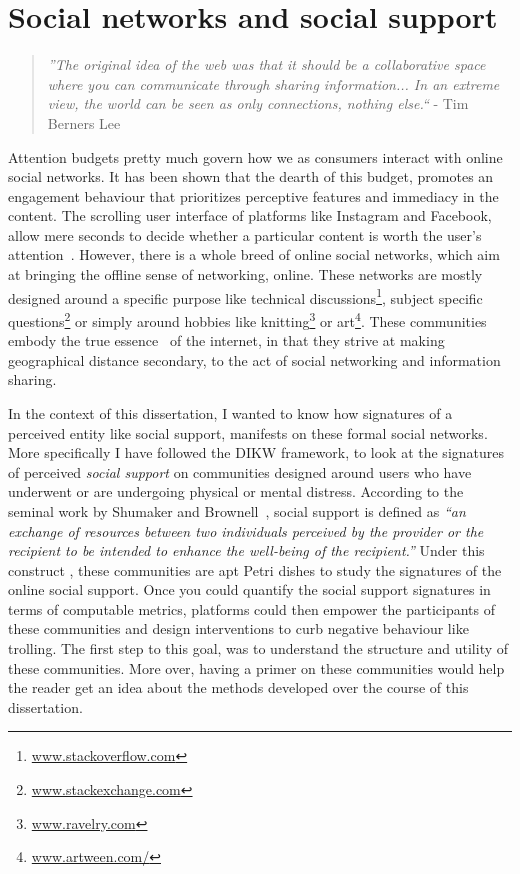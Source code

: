 
\chapter{Social networks and social support}

\label{chap:Utility_support}
\graphicspath{{Chapter3/plots/} {Chapter3/plots}}
\begin{quote}
    \textit{''The original idea of the web was that it should be a collaborative space where you can communicate through sharing information... In an extreme view, the world can be seen as only connections, nothing else.``} - Tim Berners Lee\cite{berners2001weaving} 
\end{quote}
Attention budgets pretty much govern how we as consumers interact with online social networks. It has been shown that the dearth of this budget, promotes an engagement behaviour that prioritizes perceptive features and immediacy in the content. The scrolling user interface of platforms like Instagram and Facebook, allow mere seconds to decide whether a particular content is worth the user's attention~\cite{eikelboom2017irresistible}. 
However, there is a whole breed of online social networks, which aim at bringing the offline sense of networking, online. These networks are mostly designed around a specific purpose like technical discussions\footnote{\url{www.stackoverflow.com}}, subject specific questions\footnote{\url{www.stackexchange.com}} or simply around hobbies like knitting\footnote{\url{www.ravelry.com}} or art\footnote{\url{www.artween.com/}}. These communities embody the true essence~\cite{berners2001weaving} of the internet, in that they strive at making geographical distance secondary, to the act of social networking and information sharing.

In the context of this dissertation, I wanted to know how signatures of a perceived entity like social support,  manifests on these formal social networks. More specifically I have followed the DIKW framework, to look at the signatures of perceived \textsl{social support} on communities designed around users who have underwent or are undergoing physical or mental distress. According to the seminal work by Shumaker and Brownell~\cite{shumaker1984toward}, social support is defined as \textsl{``an exchange of resources between two individuals perceived by the provider or the recipient to be intended to enhance the well-being of the recipient.''}
Under this construct , these communities are apt Petri dishes to study the signatures of the online social support. Once you could quantify the social support signatures in terms of computable metrics, platforms could then empower the participants of these communities and design interventions to curb negative behaviour like trolling. The first step to this goal, was to understand the structure and utility of these communities. More over, having a primer on these communities would help the reader get an idea about the methods developed over the course of this dissertation. 

